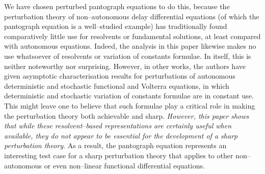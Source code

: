 \documentclass[a4paper,10pt,reqno]{amsart}
\numberwithin{equation}{section}
\theoremstyle{definition}
\theoremstyle{remark}
\DeclareMathOperator{\1}{\mathbbm 1}
\begin{document}
	We have chosen perturbed pantograph equations to do this, because the perturbation theory of non--autonomous delay differential equations (of which the pantograph equation is a well--studied example) has traditionally found comparatively little use for resolvents or fundamental solutions, at least compared with autonomous equations. Indeed, the analysis in this paper likewise makes no use whatsoever of resolvents or variation of constants formulae. In itself, this is neither noteworthy nor surprising. However, in other works, the authors have given asymptotic characterisation results for perturbations of autonomous deterministic and stochastic functional and Volterra equations, in which deterministic and stochastic variation of constants formulae are in constant use. This might leave one to believe that such formulae play a critical role in making the perturbation theory both achievable and sharp. \textit{However, this paper shows that while these resolvent--based representations are certainly useful when available, they do not appear to be essential for the development of a sharp perturbation theory}. As a result, the pantograph equation represents an interesting test case for a sharp perturbation theory that applies to other non--autonomous or even non--linear functional differential equations.         
	
\end{document}
